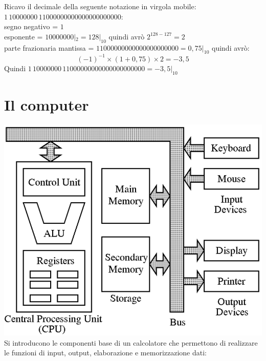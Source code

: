 \documentclass[a4paper,12pt, oneside]{book}
\begin{document}
\begin{esercizio}
	Ricavo il decimale della seguente notazione in virgola mobile: $1\,10000000\,11000000000000000000000$:\\
	segno negativo = $1$\\
	esponente = $10000000|_2=128|_{10}$ quindi avrò $2^{128-127}=2$\\
	parte frazionaria mantissa = $11000000000000000000000=0,75|_{10}$
	quindi avrò:
	$$(-1)^{-1}\times (1+0,75)\times 2= -3,5$$
	Quindi $1\,10000000\,11000000000000000000000=-3,5|_{10}$
\end{esercizio}

\chapter{Il computer}
\includegraphics[scale=0.5]{img/computer.png}\\
Si introducono le componenti base di un calcolatore che permettono di realizzare le funzioni di input, output, elaborazione e memorizzazione dati:
\end{document}
